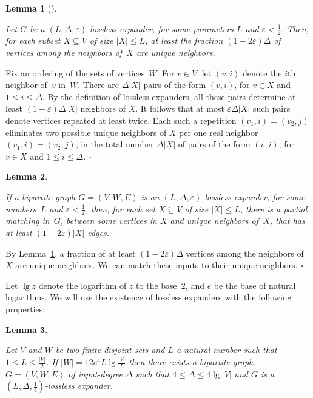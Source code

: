 \documentclass[11pt]{article}
\newcommand{\qed}{\hfill $\square$ \smallbreak}
\newenvironment{proof}{\noindent{\bf Proof:}}{\qed}
\newtheorem{lemma}{Lemma}
\begin{document}
\begin{lemma}[\cite{CapalboRVW02}]
\label{lem:from-CapalboRVW02}

Let $G$ be a $(L,\Delta,\varepsilon)$-lossless expander, for some parameters $L$ and $\varepsilon<\frac{1}{2}$.
Then, for each subset $X\subseteq V$ of size $|X|\le L$, at least the fraction $(1- 2\varepsilon )\Delta$ of vertices among the neighbors of~$X$ are unique neighbors.
\end{lemma}

\begin{proof}
Fix an ordering of the sets of vertices~$W$.
For $v\in V$, let $(v,i)$ denote the $i$th neighbor of~$v$ in~$W$.
There are $\Delta |X|$ pairs of the form $(v,i)$, for $v\in X$ and $1\le i\le \Delta$.
By the definition of lossless expanders, all these pairs determine at least $(1-\varepsilon)\Delta |X|$ neighbors of $X$.
It follows that at most $\varepsilon\Delta |X|$ such pairs denote vertices repeated at least twice. 
Each such a repetition $(v_1,i)=(v_2,j)$ eliminates two possible unique neighbors of $X$ per one real neighbor $(v_1,i)=(v_2,j)$, in the total number $\Delta |X|$ of pairs of the form $(v,i)$, for $v\in X$ and $1\le i\le \Delta$.
\end{proof}



\begin{lemma}
\label{lem:partial-matching}

If a bipartite graph $G=(V,W,E)$ is an $(L,\Delta,\varepsilon)$-lossless expander, for some numbers~$L$ and $\varepsilon<\frac{1}{2}$, then, for each set $X\subseteq V$ of size $|X|\le L$, there is a partial matching in~$G$, between some vertices in $X$ and  unique neighbors of~$X$, that has at least $(1-2\varepsilon) |X|$ edges.
\end{lemma}

\begin{proof}
By Lemma~\ref{lem:from-CapalboRVW02}, a fraction of at least $(1- 2\varepsilon )\Delta$ vertices among the neighbors of~$X$ are unique neighbors.
We can match these inputs to their unique neighbors.
\end{proof}

Let $\lg z$ denote the logarithm of $z$ to the base~$2$, and $e$ be the base of natural logarithms.
We will use the existence of lossless expanders with the following properties:



\begin{lemma}
\label{lem:expander}

Let  $V$ and $W$ be two finite disjoint sets and $L$ a natural number such that $1\le L \le \frac{|V|}{2}$.
If $|W|=12e^4 L\lg\frac{|V|}{L}$ then there exists a bipartite graph $G=(V,W,E)$ of input-degree $\Delta$ such that $4\le \Delta\le 4\lg |V|$ and $G$ is a $(L,\Delta,\frac{1}{4})$-lossless expander.
\end{lemma}
\end{document}
